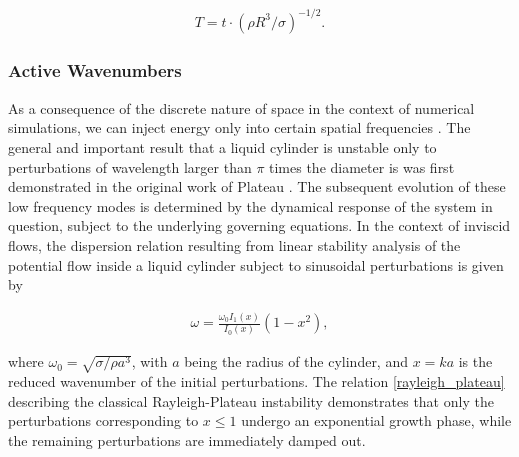 \begin{align}
	T = t \cdot \left(\rho R^3 / \sigma \right)^{-1/2} . 
\end{align}


\subsubsection*{Active Wavenumbers}

As a consequence of the discrete nature of space in
the context of numerical simulations, we can inject energy
only into certain spatial frequencies . 
The general and important result that a liquid cylinder is unstable 
only to perturbations of wavelength larger than $\pi$ times the diameter
is was first demonstrated in the original work of Plateau \cite{plateau1849}.
The subsequent evolution of these low frequency modes  
is determined by the dynamical response of the system in question, 
subject to the underlying governing equations. 
In the context of inviscid flows, the dispersion relation
resulting from linear stability analysis of the potential flow
inside a liquid cylinder subject to sinusoidal perturbations is given by

\begin{align}
\omega = \frac{\omega_0 I_1(x)}{I_0(x)} \left(1 - x^2 \right) , 
\label{rayleigh_plateau}
\end{align}
 

where $\omega_0 = \sqrt{\sigma/ \rho a^3}$, with $a$ being the radius 
of the cylinder, and $x= ka$ is the reduced wavenumber of the initial perturbations. 
The relation \eqref{rayleigh_plateau} describing the classical 
Rayleigh-Plateau instability \cite{rayleigh1879a, plateau1849} 
demonstrates that only the perturbations corresponding to $x \leq 1 $ 
undergo an exponential growth phase, while the remaining perturbations 
are immediately damped out. 

